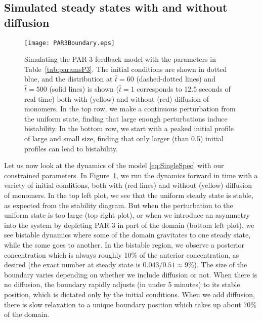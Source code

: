 \documentclass[11pt]{article}
\newcommand{\6}[1]{#1_{\text{6}}}
\newcommand{\3}[1]{#1_{\text{3}}}
\begin{document}
\subsection{Simulated steady states with and without diffusion}
\begin{figure}
\centering
\texttt{[image: PAR3Boundary.eps]}
\caption{\label{fig:P3FBBd}Simulating the PAR-3 feedback model with the parameters in Table\ \ref{tab:paramsP3}. The initial conditions are shown in dotted blue, and the distribution at $\hat t = 60$ (dashed-dotted lines) and $\hat t = 500$ (solid lines) is shown ($\hat t =1$ corresponds to 12.5 seconds of real time) both with (yellow) and without (red) diffusion of monomers. In the top row, we make a continuous perturbation from the uniform state, finding that large enough perturbations induce bistability. In the bottom row, we start with a peaked initial profile of large and small size, finding that only larger (than 0.5) initial profiles can lead to bistability. }
\end{figure}

Let us now look at the dynamics of the model \eqref{eq:SingleSpec} with our constrained parameters. In Figure\ \ref{fig:P3FBBd}, we run the dynamics forward in time with a variety of initial conditions, both with (red lines) and without (yellow) diffusion of monomers. In the top left plot, we see that the uniform steady state is stable, as expected from the stability diagram. But when the perturbation to the uniform state is too large (top right plot), or when we introduce an asymmetry into the system by depleting PAR-3 in part of the domain (bottom left plot), we see bistable dynamics where some of the domain gravitates to one steady state, while the some goes to another. In the bistable region, we observe a posterior concentration which is always roughly 10\% of the anterior concentration, as desired (the exact number at steady state is $0.043/0.51 \approx 9$\%). The size of the boundary varies depending on whether we include diffusion or not. When there is no diffusion, the boundary rapidly adjusts (in under 5 minutes) to its stable position, which is dictated only by the initial conditions. When we add diffusion, there is slow relaxation to a unique boundary position which takes up about 70\% of the domain. 
\end{document}
